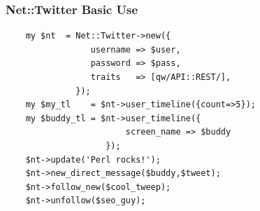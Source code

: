 \documentclass[12pt]{beamer}
\begin{document}
\begin{frame}[fragile]
    \frametitle{Net::Twitter Basic Use}
    \begin{small}
    \begin{verbatim}
    my $nt  = Net::Twitter->new({
                 username => $user,
                 password => $pass,
                 traits   => [qw/API::REST/],
              });
    my $my_tl    = $nt->user_timeline({count=>5});
    my $buddy_tl = $nt->user_timeline({
                        screen_name => $buddy
                    });
    $nt->update('Perl rocks!');
    $nt->new_direct_message($buddy,$tweet);
    $nt->follow_new($cool_tweep);
    $nt->unfollow($seo_guy);

    \end{verbatim}
    \end{small}
\end{frame}






\end{document}
